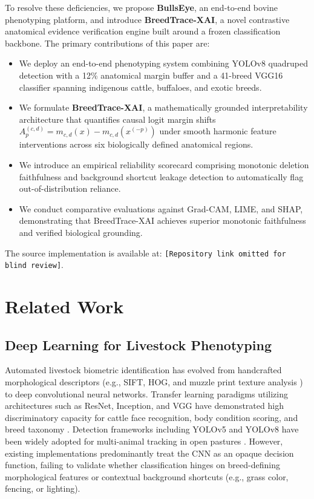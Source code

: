 \documentclass[conference]{IEEEtran}
\begin{document}
To resolve these deficiencies, we propose \textbf{BullsEye}, an end-to-end bovine phenotyping platform, and introduce \textbf{BreedTrace-XAI}, a novel contrastive anatomical evidence verification engine built around a frozen classification backbone. The primary contributions of this paper are:
\begin{itemize}
    \item We deploy an end-to-end phenotyping system combining YOLOv8 quadruped detection with a 12\% anatomical margin buffer and a 41-breed VGG16 classifier spanning indigenous cattle, buffaloes, and exotic breeds.
    \item We formulate \textbf{BreedTrace-XAI}, a mathematically grounded interpretability architecture that quantifies causal logit margin shifts $A_p^{(c,d)} = m_{c,d}(x) - m_{c,d}(x^{(-p)})$ under smooth harmonic feature interventions across six biologically defined anatomical regions.
    \item We introduce an empirical reliability scorecard comprising monotonic deletion faithfulness and background shortcut leakage detection to automatically flag out-of-distribution reliance.
    \item We conduct comparative evaluations against Grad-CAM, LIME, and SHAP, demonstrating that BreedTrace-XAI achieves superior monotonic faithfulness and verified biological grounding.
\end{itemize}

The source implementation is available at: \texttt{[Repository link omitted for blind review]}.

\section{Related Work}

\subsection{Deep Learning for Livestock Phenotyping}
Automated livestock biometric identification has evolved from handcrafted morphological descriptors (e.g., SIFT, HOG, and muzzle print texture analysis \cite{kumar2018muzzle}) to deep convolutional neural networks. Transfer learning paradigms utilizing architectures such as ResNet, Inception, and VGG have demonstrated high discriminatory capacity for cattle face recognition, body condition scoring, and breed taxonomy \cite{zheng2020cattle, acharya2021deep}. Detection frameworks including YOLOv5 and YOLOv8 have been widely adopted for multi-animal tracking in open pastures \cite{tassinari2021yolo}. However, existing implementations predominantly treat the CNN as an opaque decision function, failing to validate whether classification hinges on breed-defining morphological features or contextual background shortcuts (e.g., grass color, fencing, or lighting).
\end{document}
